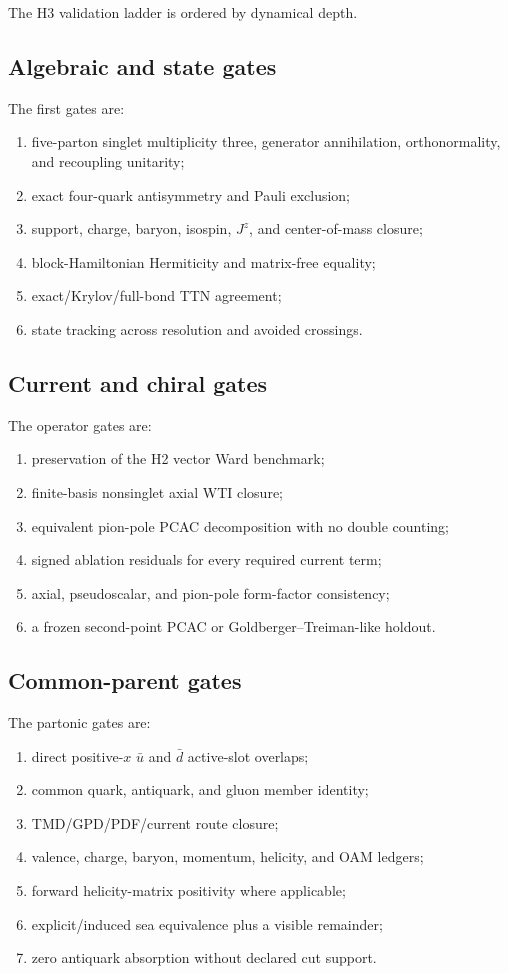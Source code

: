 \documentclass[11pt]{article}
\newcommand{\Jz}{J^z}
\begin{document}
The H3 validation ladder is ordered by dynamical depth.

\subsection{Algebraic and state gates}

The first gates are:
\begin{enumerate}
 \item five-parton singlet multiplicity three, generator annihilation,
       orthonormality, and recoupling unitarity;
 \item exact four-quark antisymmetry and Pauli exclusion;
 \item support, charge, baryon, isospin, \(\Jz\), and center-of-mass closure;
 \item block-Hamiltonian Hermiticity and matrix-free equality;
 \item exact/Krylov/full-bond TTN agreement;
 \item state tracking across resolution and avoided crossings.
\end{enumerate}

\subsection{Current and chiral gates}

The operator gates are:
\begin{enumerate}
 \item preservation of the H2 vector Ward benchmark;
 \item finite-basis nonsinglet axial WTI closure;
 \item equivalent pion-pole PCAC decomposition with no double counting;
 \item signed ablation residuals for every required current term;
 \item axial, pseudoscalar, and pion-pole form-factor consistency;
 \item a frozen second-point PCAC or Goldberger--Treiman-like holdout.
\end{enumerate}

\subsection{Common-parent gates}

The partonic gates are:
\begin{enumerate}
 \item direct positive-\(x\) \(\bar u\) and \(\bar d\) active-slot overlaps;
 \item common quark, antiquark, and gluon member identity;
 \item TMD/GPD/PDF/current route closure;
 \item valence, charge, baryon, momentum, helicity, and OAM ledgers;
 \item forward helicity-matrix positivity where applicable;
 \item explicit/induced sea equivalence plus a visible remainder;
 \item zero antiquark absorption without declared cut support.
\end{enumerate}
\end{document}
